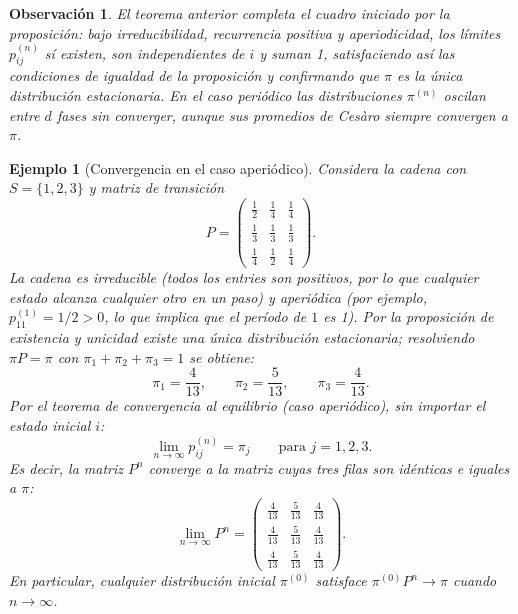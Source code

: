 \documentclass[12pt]{book}
\newtheorem{example}{Ejemplo}[chapter]
\newtheorem{remark}{Observación}[chapter]
\begin{document}
\begin{remark}
    El teorema anterior completa el cuadro iniciado por la proposición: bajo irreducibilidad, recurrencia positiva y aperiodicidad, los límites $p_{ij}^{(n)}$ sí existen, son independientes de $i$ y suman 1, satisfaciendo así las condiciones de igualdad de la proposición y confirmando que $\pi$ es la única distribución estacionaria. En el caso periódico las distribuciones $\pi^{(n)}$ oscilan entre $d$ fases sin converger, aunque sus promedios de Cesàro siempre convergen a $\pi$.
\end{remark}

\begin{example}[Convergencia en el caso aperiódico]
    Considera la cadena con $S = \{1, 2, 3\}$ y matriz de transición
    \[
        P = \begin{pmatrix}
            \tfrac{1}{2} & \tfrac{1}{4} & \tfrac{1}{4} \\[4pt]
            \tfrac{1}{3} & \tfrac{1}{3} & \tfrac{1}{3} \\[4pt]
            \tfrac{1}{4} & \tfrac{1}{2} & \tfrac{1}{4}
        \end{pmatrix}.
    \]
    La cadena es irreducible (todos los entries son positivos, por lo que cualquier estado alcanza cualquier otro en un paso) y aperiódica (por ejemplo, $p_{11}^{(1)} = 1/2 > 0$, lo que implica que el período de $1$ es 1). Por la proposición de existencia y unicidad existe una única distribución estacionaria; resolviendo $\pi P = \pi$ con $\pi_1 + \pi_2 + \pi_3 = 1$ se obtiene:
    \[
        \pi_1 = \frac{4}{13}, \qquad \pi_2 = \frac{5}{13}, \qquad \pi_3 = \frac{4}{13}.
    \]
    Por el teorema de convergencia al equilibrio (caso aperiódico), sin importar el estado inicial $i$:
    \[
        \lim_{n\to\infty} p_{ij}^{(n)} = \pi_j \qquad \text{para } j = 1, 2, 3.
    \]
    Es decir, la matriz $P^n$ converge a la matriz cuyas tres filas son idénticas e iguales a $\pi$:
    \[
        \lim_{n\to\infty} P^n =
        \begin{pmatrix}
            \tfrac{4}{13} & \tfrac{5}{13} & \tfrac{4}{13} \\[4pt]
            \tfrac{4}{13} & \tfrac{5}{13} & \tfrac{4}{13} \\[4pt]
            \tfrac{4}{13} & \tfrac{5}{13} & \tfrac{4}{13}
        \end{pmatrix}.
    \]
    En particular, cualquier distribución inicial $\pi^{(0)}$ satisface $\pi^{(0)} P^n \to \pi$ cuando $n \to \infty$.
\end{example}
\end{document}
